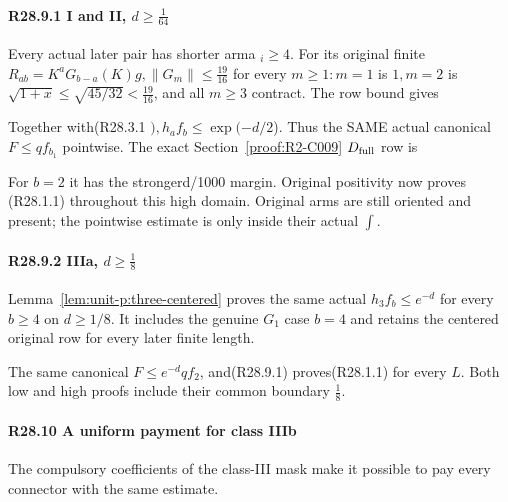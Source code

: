 \paragraph{R28.9.1 I and II, \(d\ge \frac{1}{64}\)}

Every actual later pair has shorter arma \(_i\ge 4\). For its original finite \(R_{ab}=K^a G_{b-a}(K)g,\allowbreak \allowbreak  \lVert G_m\rVert \le \frac{19}{16}\) for every \(m\ge 1: m=1\) is \(1,\allowbreak \allowbreak m=2\) is \(\sqrt{1+x}\le \sqrt{45/32}<\frac{19}{16}\), and all \(m\ge 3\) contract. The row bound gives


Together with(R28.3.1 \(),\allowbreak \allowbreak h_a f_b\le \exp(-d/2\)). Thus the SAME actual canonical \(F\le q f_{b_{1}}\) pointwise. The exact Section~\ref{proof:R2-C009} \(D_{\rm full}\) row is


For \(b=2\) it has the strongerd/1000 margin. Original positivity now proves (R28.1.1) throughout this high domain. Original arms are still oriented and present; the pointwise estimate is only inside their actual \(\int \).

\paragraph{R28.9.2 IIIa, \(d\ge \frac{1}{8}\)}

Lemma~\ref{lem:unit-p:three-centered} proves the same actual
\(h_3f_b\le e^{-d}\) for every \(b\ge4\) on \(d\ge1/8\).
It includes the genuine \(G_1\) case \(b=4\) and retains
the centered original row for every later finite length.

The same canonical \(F\le e^{-d} q f_{2}\), and(R28.9.1) proves(R28.1.1) for every \(L\). Both low and high proofs include their common boundary \(\frac{1}{8}\).

\paragraph{R28.10 A uniform payment for class IIIb}
\label{part:R28:global-mask}

The compulsory coefficients of the class-III mask make it possible
to pay every connector with the same estimate.

